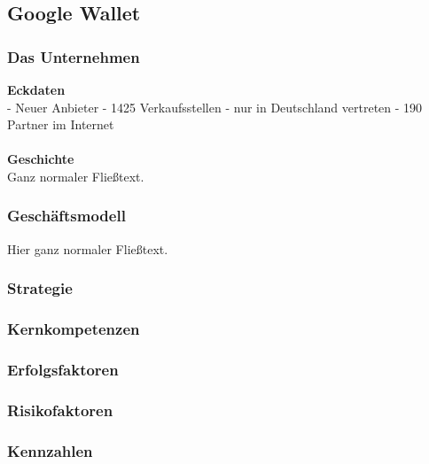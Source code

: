 \subsection{Google Wallet}
\subsubsection{Das Unternehmen}

\textbf{Eckdaten}\\
- Neuer Anbieter
- 1425 Verkaufsstellen
- nur in Deutschland vertreten
- 190 Partner im Internet\\
\\
%
%
\textbf{Geschichte}\\
Ganz normaler Fließtext.

\subsubsection{Geschäftsmodell}
Hier ganz normaler Fließtext.

\subsubsection{Strategie}

\subsubsection{Kernkompetenzen}

\subsubsection{Erfolgsfaktoren}

\subsubsection{Risikofaktoren}

\subsubsection{Kennzahlen}
